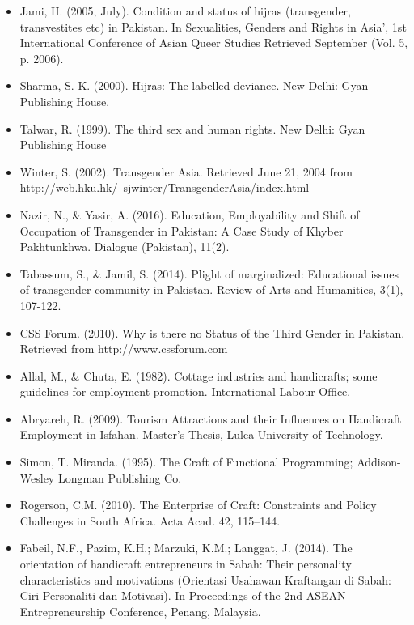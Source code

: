 \begin{itemize}
     
\item Jami, H. (2005, July). Condition and status of hijras (transgender, transvestites etc) in Pakistan. In Sexualities, Genders and Rights in Asia’, 1st International Conference of Asian Queer Studies Retrieved September (Vol. 5, p. 2006).

\item Sharma, S. K. (2000). Hijras: The labelled deviance. New Delhi: Gyan Publishing House.

\item Talwar, R. (1999). The third sex and human rights. New Delhi: Gyan Publishing House

\item Winter, S. (2002). Transgender Asia. Retrieved June 21, 2004 from http://web.hku.hk/~sjwinter/TransgenderAsia/index.html

\item Nazir, N., \& Yasir, A. (2016). Education, Employability and Shift of Occupation of Transgender in Pakistan: A Case Study of Khyber Pakhtunkhwa. Dialogue (Pakistan), 11(2).

\item Tabassum, S., \& Jamil, S. (2014). Plight of marginalized: Educational issues of transgender community in Pakistan. Review of Arts and Humanities, 3(1), 107-122. 

\item CSS Forum. (2010). Why is there no Status of the Third Gender in Pakistan. Retrieved from http://www.cssforum.com

\item Allal, M., \& Chuta, E. (1982). Cottage industries and handicrafts; some guidelines for employment promotion. International Labour Office.

\item Abryareh, R. (2009). Tourism Attractions and their Influences on Handicraft Employment in Isfahan. Master’s Thesis, Lulea University of Technology.

\item Simon, T. Miranda. (1995). The Craft of Functional Programming; Addison-Wesley Longman Publishing Co.

\item Rogerson, C.M. (2010). The Enterprise of Craft: Constraints and Policy Challenges in South Africa. Acta Acad. 42, 115–144.

\item Fabeil, N.F., Pazim, K.H.; Marzuki, K.M.; Langgat, J. (2014). The orientation of handicraft entrepreneurs in Sabah: Their personality characteristics and motivations (Orientasi Usahawan Kraftangan di Sabah: Ciri Personaliti dan Motivasi). In Proceedings of the 2nd ASEAN Entrepreneurship Conference, Penang, Malaysia.


\end{itemize}
